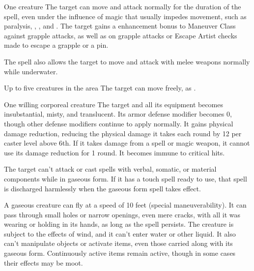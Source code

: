 \spellrng{\rngtouch}
\spelldur{\durshort}
\begin{spelltarget}{One creature}
    \spelleffect The target can move and attack normally for the duration of the spell, even under the influence of magic that usually impedes movement, such as paralysis, , , and . The target gains a  enhancement bonus to Maneuver Class against grapple attacks, as well as on grapple attacks or Escape Artist checks made to escape a grapple or a pin.
    \par The spell also allows the target to move and attack with melee weapons normally while underwater.
\end{spelltarget}

\begin{spelltargets}{Up to five creatures in the area}
    \spelleffect The target can move freely, as .
\end{spelltargets}

\begin{comment}
\subsubsection{G}
\end{comment}

\spellrng{\rngtouch}
\spelldur{\durshort \dismissable}
\begin{spelltarget}{One willing corporeal creature}
    \spelleffect The target and all its equipment becomes insubstantial, misty, and translucent. Its armor defense modifier becomes 0, though other defense modifiers continue to apply normally. It gains physical damage reduction, reducing the physical damage it takes each round by 12  per caster level above 6th. If it takes damage from a spell or magic weapon, it cannot use its damage reduction for 1 round. It becomes immune to critical hits.

    The target can't attack or cast spells with verbal, somatic, or material components while in gaseous form. If it has a touch spell ready to use, that spell is discharged harmlessly when the gaseous form spell takes effect.
    \par A gaseous creature can fly at a speed of 10 feet (special maneuverability). It can pass through small holes or narrow openings, even mere cracks, with all it was wearing or holding in its hands, as long as the spell persists. The creature is subject to the effects of wind, and it can't enter water or other liquid. It also can't manipulate objects or activate items, even those carried along with its gaseous form. Continuously active items remain active, though in some cases their effects may be moot.
\end{spelltarget}

